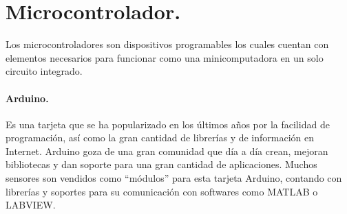 \section{Microcontrolador.}
Los microcontroladores son dispositivos programables los cuales cuentan con elementos necesarios para funcionar como una minicomputadora en un solo circuito integrado. %


\paragraph{Arduino.} 
Es una tarjeta que se ha popularizado en los últimos años por la facilidad de programación, así como la gran cantidad de librerías y de información en Internet. Arduino goza de una gran comunidad que día a día crean, mejoran bibliotecas y dan soporte para una gran cantidad de aplicaciones. Muchos sensores son vendidos como ``módulos'' para esta tarjeta Arduino, contando con librerías y soportes para su comunicación con softwares como MATLAB o LABVIEW. 

